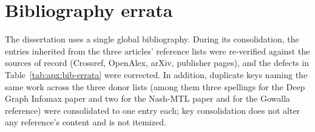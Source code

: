 %
% 

\section{Bibliography errata}
\label{apx:errata:bib}

The dissertation uses a single global bibliography. During its consolidation, the
entries inherited from the three articles' reference lists were re-verified against
the sources of record (Crossref, OpenAlex, arXiv, publisher pages), and the defects in
Table~\ref{tab:apx:bib-errata} were corrected. In addition, duplicate keys naming the
same work across the three donor lists (among them three spellings for the Deep Graph
Infomax paper and two for the Nash-MTL paper and for the Gowalla reference) were
consolidated to one entry each; key consolidation does not alter any reference's
content and is not itemized.


